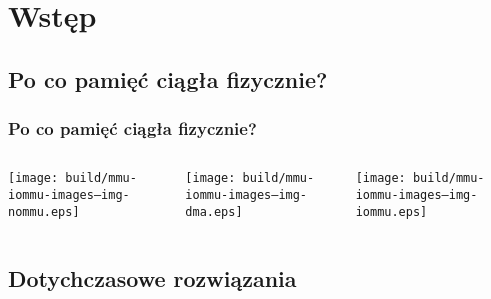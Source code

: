 
\section{Wstęp}

\subsection{Po co pamięć ciągła fizycznie?}

\begin{frame}
  \frametitle{Po co pamięć ciągła fizycznie?}
  \begin{columns}[c]

    \begin{center}
      \texttt{[image: build/mmu-iommu-images--img-nommu.eps]}
    \end{center}

    \begin{center}
      \texttt{[image: build/mmu-iommu-images--img-dma.eps]}
    \end{center}

    \begin{center}
      \texttt{[image: build/mmu-iommu-images--img-iommu.eps]}
    \end{center}

  \end{columns}
\end{frame}

\subsection{Dotychczasowe rozwiązania}


